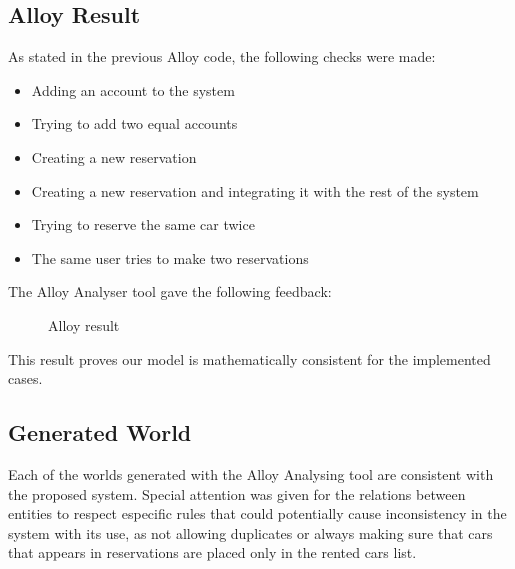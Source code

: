 \documentclass[a4paper]{article}
\begin{document}
\subsection{Alloy Result}
As stated  in the previous Alloy code, the following checks were made:
\begin{itemize}
\item Adding an account to the system
\item Trying to add two equal accounts
\item Creating a new reservation
\item Creating a new reservation and integrating it with the rest of the system
\item Trying to reserve the same car twice
\item The same user tries to make two reservations
\end{itemize}

The Alloy Analyser tool gave the following feedback:

\begin{figure}[h]
\centering
\vspace*{\fill}
\noindent{}%
\caption {Alloy result}
\vspace*{0.5cm}
\end{figure}
This result proves our model is mathematically consistent for the implemented cases.

\subsection{Generated World}
Each of the worlds generated with the Alloy Analysing tool are consistent with the proposed system. Special attention was given for the relations between entities to respect especific rules that could potentially cause inconsistency in the system with its use, as not allowing duplicates or always making sure that cars that appears in reservations are placed only in the rented cars list.   
\end{document}
